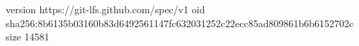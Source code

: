 version https://git-lfs.github.com/spec/v1
oid sha256:8b6135b03160b83d6492561147fc632031252c22ecc85ad809861b6b6152702c
size 14581
